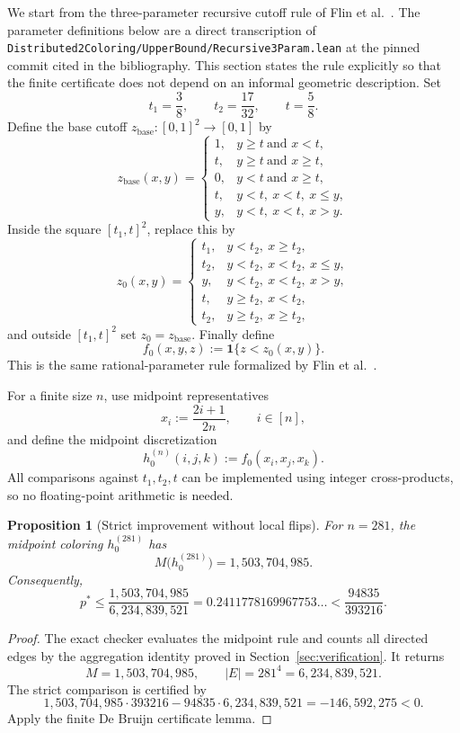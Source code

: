 \documentclass[11pt]{article}
\newtheorem{proposition}[theorem]{Proposition}
\newcommand{\1}{\mathbf{1}}
\begin{document}
We start from the three-parameter recursive cutoff rule of Flin et
al.~\cite{flin2026lean}.  The parameter definitions below are a direct
transcription of
\texttt{Distributed2Coloring/UpperBound/Recursive3Param.lean} at the pinned
commit cited in the bibliography.
This section states the rule explicitly so
that the finite certificate does not depend on an informal geometric
description.
Set
\[
  t_1 = \frac38,
  \qquad
  t_2 = \frac{17}{32},
  \qquad
  t = \frac58.
\]
Define the base cutoff $z_{\mathrm{base}}:[0,1]^2\to[0,1]$ by
\[
 z_{\mathrm{base}}(x,y)=
 \begin{cases}
   1, & y\ge t\ \text{and }x<t,\\
   t, & y\ge t\ \text{and }x\ge t,\\
   0, & y<t\ \text{and }x\ge t,\\
   t, & y<t,\ x<t,\ x\le y,\\
   y, & y<t,\ x<t,\ x>y.
 \end{cases}
\]
Inside the square $[t_1,t]^2$, replace this by
\[
 z_0(x,y)=
 \begin{cases}
   t_1, & y<t_2,\ x\ge t_2,\\
   t_2, & y<t_2,\ x<t_2,\ x\le y,\\
   y,   & y<t_2,\ x<t_2,\ x>y,\\
   t,   & y\ge t_2,\ x<t_2,\\
   t_2, & y\ge t_2,\ x\ge t_2,
 \end{cases}
\]
and outside $[t_1,t]^2$ set $z_0=z_{\mathrm{base}}$.  Finally define
\[
  f_0(x,y,z):=\1\{z<z_0(x,y)\}.
\]
This is the same rational-parameter rule formalized by Flin et
al.~\cite{flin2026lean}.

For a finite size $n$, use midpoint representatives
\[
  x_i:=\frac{2i+1}{2n},
  \qquad i\in[n],
\]
and define the midpoint discretization
\[
  h^{(n)}_0(i,j,k):=f_0(x_i,x_j,x_k).
\]
All comparisons against $t_1,t_2,t$ can be implemented using integer
cross-products, so no floating-point arithmetic is needed.

\begin{proposition}[Strict improvement without local flips]
For $n = 281$, the midpoint coloring $h^{(281)}_0$ has
\[
  M\bigl(h^{(281)}_0\bigr)=1{,}503{,}704{,}985.
\]
Consequently,
\[
  p^*\le
  \frac{1{,}503{,}704{,}985}{6{,}234{,}839{,}521}
  =0.2411778169967753\ldots
  <\frac{94835}{393216}.
\]
\end{proposition}

\begin{proof}
The exact checker evaluates the midpoint rule and counts all directed edges
by the aggregation identity proved in Section~\ref{sec:verification}.  It
returns
\[
  M=1{,}503{,}704{,}985,
  \qquad
  |E|=281^4=6{,}234{,}839{,}521.
\]
The strict comparison is certified by
\[
  1{,}503{,}704{,}985\cdot393216
  -94835\cdot6{,}234{,}839{,}521
  =-146{,}592{,}275<0.
\]
Apply the finite De Bruijn certificate lemma.
\end{proof}
\end{document}
